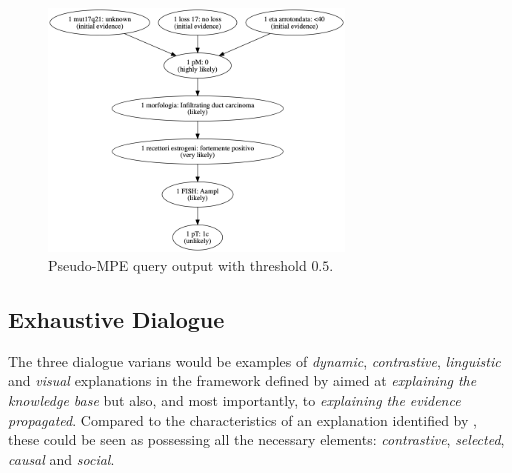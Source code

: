 \begin{figure}[htbp]
\centerline{\includegraphics[width=0.7\textwidth]{results/images/pseudo_mpe_output}}
\caption{Pseudo-MPE query output with threshold $0.5$.}
\label{fig:pseudo_mpe_output}
\end{figure}
%
%

\subsection{Exhaustive Dialogue} \label{subsec:dialogue-results}
The three dialogue varians would be examples of \textit{dynamic}, \textit{contrastive}, \textit{linguistic} and \textit{visual} explanations in the framework defined by \citet{lacave2002review} aimed at \textit{explaining the knowledge base} but also, and most importantly, to \textit{explaining the evidence propagated}.
Compared to the characteristics of an explanation identified by \citet{miller2018explanation}, these could be seen as possessing all the necessary elements: \textit{contrastive}, \textit{selected}, \textit{causal} and \textit{social}.

